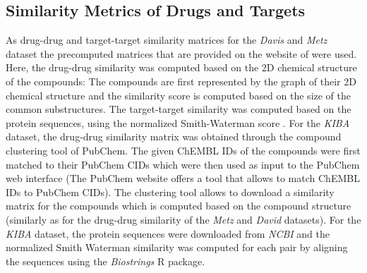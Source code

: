 \subsection{Similarity Metrics of Drugs and Targets}
As drug-drug and target-target similarity matrices for the \textit{Davis} and \textit{Metz} dataset the precomputed matrices that are provided on the website of \cite{pahikkala2014toward} were used. Here, the drug-drug similarity was computed based on the 2D chemical structure of the compounds: The compounds are first represented by the graph of their 2D chemical structure and the similarity score is computed based on the size of the common substructures. The target-target similarity was computed based on the protein sequences, using the normalized Smith-Waterman score \cite{yamanishi2008prediction} . For the \textit{KIBA} dataset, the drug-drug similarity matrix was obtained through the compound clustering tool of PubChem. The given ChEMBL IDs of the compounds were first matched to their PubChem CIDs which were then used as input to the PubChem web interface (The PubChem website offers a tool that allows to match ChEMBL IDs to PubChem CIDs). The clustering tool allows to download a similarity matrix for the compounds which is computed based on the compound structure (similarly as for the drug-drug similarity of the \textit{Metz} and \textit{David} datasets). For the \textit{KIBA} dataset, the protein sequences were downloaded from \textit{NCBI} and the normalized Smith Waterman similarity was computed for each pair by aligning the sequences using the \textit{Biostrings} R package.

